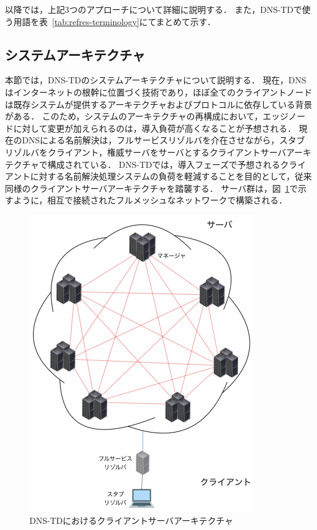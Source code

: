 以降では，上記3つのアプローチについて詳細に説明する．
また，DNS-TDで使う用語を表~\ref{tab:refres-terminology}にてまとめて示す．



\newpage
\subsection{システムアーキテクチャ}
\label{sec:system-architecture}
本節では，DNS-TDのシステムアーキテクチャについて説明する．
現在，DNSはインターネットの根幹に位置づく技術であり，ほぼ全てのクライアントノードは既存システムが提供するアーキテクチャおよびプロトコルに依存している背景がある．
このため，システムのアーキテクチャの再構成において，エッジノードに対して変更が加えられるのは，導入負荷が高くなることが予想される．
現在のDNSによる名前解決は，フルサービスリゾルバを介在させながら，スタブリゾルバをクライアント，権威サーバをサーバとするクライアントサーバアーキテクチャで構成されている．
DNS-TDでは，導入フェーズで予想されるクライアントに対する名前解決処理システムの負荷を軽減することを目的として，従来同様のクライアントサーバアーキテクチャを踏襲する．
サーバ群は，図~\ref{fig:system-architecture}で示すように，相互で接続されたフルメッシュなネットワークで構築される．
\begin{figure}[htbp]
 \centering
 \includegraphics[scale=0.5]{figure/system-architecture.png}
 \caption{DNS-TDにおけるクライアントサーバアーキテクチャ}
 \label{fig:system-architecture}
\end{figure}


